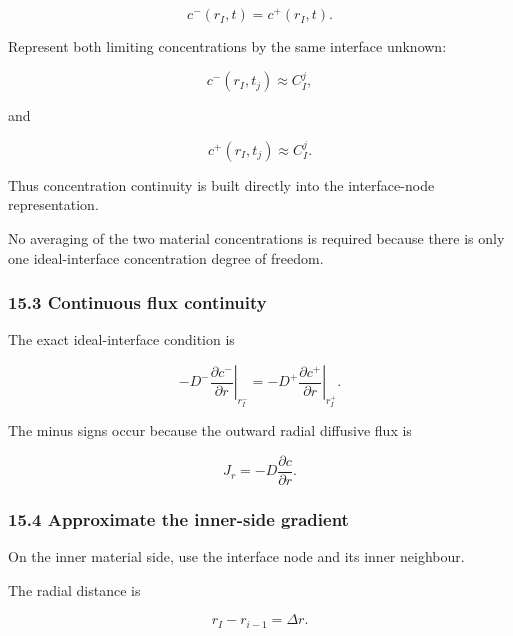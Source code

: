 \documentclass[11pt,a4paper]{article}
\begin{document}
\begin{equation}
c^-(r_I,t)=c^+(r_I,t).
\tag{TRISO-DIS-307}
\label{eq:triso-dis-307}
\end{equation}

Represent both limiting concentrations by the same interface unknown:

\begin{equation}
c^-(r_I,t_j)\approx C_I^j,
\tag{TRISO-DIS-308}
\label{eq:triso-dis-308}
\end{equation}

and

\begin{equation}
c^+(r_I,t_j)\approx C_I^j.
\tag{TRISO-DIS-309}
\label{eq:triso-dis-309}
\end{equation}

Thus concentration continuity is built directly into the interface-node representation.

No averaging of the two material concentrations is required because there is only one ideal-interface concentration degree of freedom.

\subsubsection*{15.3 Continuous flux continuity}

The exact ideal-interface condition is

\begin{equation}
-D^-
\left.
\frac{\partial c^-}{\partial r}
\right|_{r_I^-}
=
-D^+
\left.
\frac{\partial c^+}{\partial r}
\right|_{r_I^+}.
\tag{TRISO-DIS-310}
\label{eq:triso-dis-310}
\end{equation}

The minus signs occur because the outward radial diffusive flux is

\begin{equation}
J_r=-D\frac{\partial c}{\partial r}.
\tag{TRISO-DIS-311}
\label{eq:triso-dis-311}
\end{equation}

\subsubsection*{15.4 Approximate the inner-side gradient}

On the inner material side, use the interface node and its inner neighbour.

The radial distance is

\begin{equation}
r_I-r_{i-1}=\Delta r.
\tag{TRISO-DIS-312}
\label{eq:triso-dis-312}
\end{equation}
\end{document}
